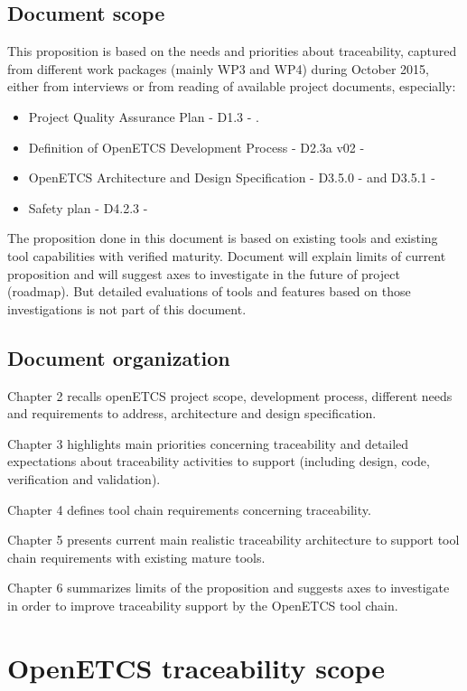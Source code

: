 \documentclass[11pt]{template/openetcs_report}
\begin{document}
\section{Document scope}
This proposition is based on the needs and priorities about traceability, captured from different work packages (mainly WP3 and WP4) during October 2015, either from interviews or from reading of available project documents, especially:
\begin{itemize} 
\item Project Quality Assurance Plan - D1.3 - \cite{qa-plan}.
\item Definition of OpenETCS Development Process - D2.3a v02 - \cite{D2.3a}
\item OpenETCS Architecture and Design Specification - D3.5.0 - \cite{D3.5.0}  and D3.5.1 - \cite{D3.5.3}
\item Safety plan - D4.2.3 - \cite{D4.2.3}
\end{itemize}

The proposition done in this document is based on existing tools and existing tool capabilities with verified maturity. Document will explain limits of current proposition and will suggest axes to investigate in the future of project (roadmap).
But detailed evaluations of tools and features based on those investigations is not part of this document.

\section{Document organization}
Chapter 2 recalls openETCS project scope, development process, different needs and requirements to address, architecture and design specification.

Chapter 3 highlights main priorities concerning traceability and detailed expectations about traceability activities to support (including design, code, verification and validation).

Chapter 4 defines tool chain requirements concerning traceability.

Chapter 5 presents current main realistic traceability architecture to support tool chain requirements with existing mature tools.

Chapter 6 summarizes limits of the proposition and suggests axes to investigate in order to improve traceability support by the OpenETCS tool chain.

\chapter{OpenETCS traceability scope}
\end{document}
